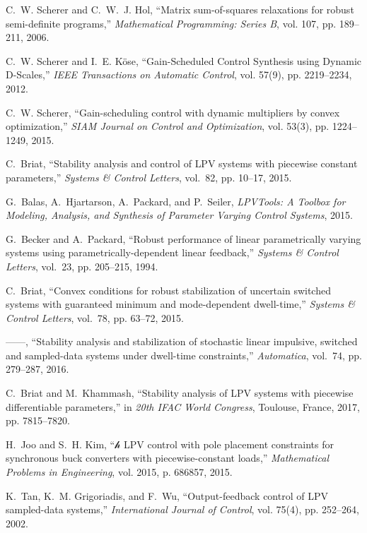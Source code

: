 \documentclass[12pt]{article}
\begin{document}
{\begin{thebibliography}{10}
C.~W. Scherer and C.~W.~J. Hol, ``Matrix sum-of-squares relaxations for robust
  semi-definite programs,'' \emph{Mathematical Programming: Series B}, vol.
  107, pp. 189--211, 2006.

C.~W. Scherer and I.~E. K{\"{o}}se, ``{Gain-Scheduled Control Synthesis using
  Dynamic {D}-Scales},'' \emph{{IEEE Transactions on Automatic Control}}, vol.
  57(9), pp. 2219--2234, 2012.

C.~W. Scherer, ``Gain-scheduling control with dynamic multipliers by convex
  optimization,'' \emph{SIAM Journal on Control and Optimization}, vol. 53(3),
  pp. 1224--1249, 2015.

C.~Briat, ``Stability analysis and control of {LPV} systems with piecewise
  constant parameters,'' \emph{Systems \& Control Letters}, vol.~82, pp.
  10--17, 2015.

G.~Balas, A.~Hjartarson, A.~Packard, and P.~Seiler, \emph{{LPVTools: A Toolbox
  for Modeling, Analysis, and Synthesis of Parameter Varying Control Systems}},
  2015.

G.~Becker and A.~Packard, ``Robust performance of linear parametrically varying
  systems using parametrically-dependent linear feedback,'' \emph{Systems \&
  Control Letters}, vol.~23, pp. 205--215, 1994.

C.~Briat, ``Convex conditions for robust stabilization of uncertain switched
  systems with guaranteed minimum and mode-dependent dwell-time,''
  \emph{Systems \& Control Letters}, vol.~78, pp. 63--72, 2015.

------, ``Stability analysis and stabilization of stochastic linear impulsive,
  switched and sampled-data systems under dwell-time constraints,''
  \emph{Automatica}, vol.~74, pp. 279--287, 2016.

C.~Briat and M.~Khammash, ``Stability analysis of {LPV} systems with piecewise
  differentiable parameters,'' in \emph{20th IFAC World Congress}, Toulouse,
  France, 2017, pp. 7815--7820.

H.~Joo and S.~H. Kim, ``${\mathscr{h}}$ {LPV} control with pole placement
  constraints for synchronous buck converters with piecewise-constant loads,''
  \emph{Mathematical Problems in Engineering}, vol. 2015, p. 686857, 2015.

K.~Tan, K.~M. Grigoriadis, and F.~Wu, ``Output-feedback control of {LPV}
  sampled-data systems,'' \emph{International Journal of Control}, vol. 75(4),
  pp. 252--264, 2002.


\end{thebibliography}}
\end{document}
